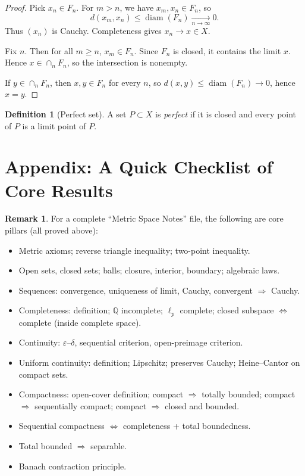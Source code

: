 \documentclass[11pt]{article}
\theoremstyle{definition}
\newtheorem{definition}[theorem]{Definition}
\newtheorem{remark}[theorem]{Remark}
\newcommand{\Q}{\mathbb{Q}}
\newcommand{\eps}{\varepsilon}
\newcommand{\diam}{\operatorname{diam}}
\begin{document}
\begin{proof}
Pick $x_n\in F_n$. For $m>n$, we have $x_m,x_n\in F_n$, so
\[
d(x_m,x_n)\le \diam(F_n)\xrightarrow[n\to\infty]{}0.
\]
Thus $(x_n)$ is Cauchy. Completeness gives $x_n\to x\in X$.

Fix $n$. Then for all $m\ge n$, $x_m\in F_n$. Since $F_n$ is closed, it contains the limit $x$.
Hence $x\in \cap_n F_n$, so the intersection is nonempty.

If $y\in\cap_n F_n$, then $x,y\in F_n$ for every $n$, so $d(x,y)\le \diam(F_n)\to 0$, hence $x=y$.
\end{proof}

\begin{definition}[Perfect set]
A set $P\subset X$ is \emph{perfect} if it is closed and every point of $P$ is a limit point of $P$.
\end{definition}

\section{Appendix: A Quick Checklist of Core Results}

\begin{remark}
For a complete ``Metric Space Notes'' file, the following are core pillars (all proved above):
\begin{itemize}
\item Metric axioms; reverse triangle inequality; two-point inequality.
\item Open sets, closed sets; balls; closure, interior, boundary; algebraic laws.
\item Sequences: convergence, uniqueness of limit, Cauchy, convergent $\Rightarrow$ Cauchy.
\item Completeness: definition; $\Q$ incomplete; $\ell_p$ complete; closed subspace $\iff$ complete (inside complete space).
\item Continuity: $\eps$--$\delta$, sequential criterion, open-preimage criterion.
\item Uniform continuity: definition; Lipschitz; preserves Cauchy; Heine--Cantor on compact sets.
\item Compactness: open-cover definition; compact $\Rightarrow$ totally bounded; compact $\Rightarrow$ sequentially compact; compact $\Rightarrow$ closed and bounded.
\item Sequential compactness $\Leftrightarrow$ completeness + total boundedness.
\item Total bounded $\Rightarrow$ separable.
\item Banach contraction principle.
\end{itemize}
\end{remark}
\end{document}
